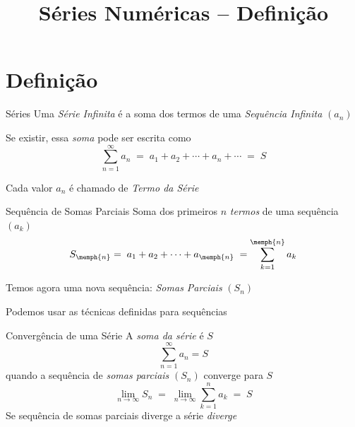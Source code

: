 \documentclass[fleqn,utf8,aspectratio=169,12pt]{beamer}
\title{Séries Numéricas -- Definição}
\begin{document}
\addtitle

\section{Definição}

\begin{frame}{Séries}
    Uma \emph{Série Infinita} é a soma dos termos de uma \emph{Sequência Infinita} $(a_n)$

    \pause
    \vspace{\baselineskip}
    Se existir, essa \emph{soma} pode ser escrita como
    \[
      \sum_{n=1}^\infty a_n
      \;=\; a_1 + a_2 + \cdots + a_n + \cdots
      \;=\; S
    \]

    \pause
    Cada valor $a_n$ é chamado de \emph{Termo da Série}

\end{frame}

\begin{frame}{Sequência de Somas Parciais}
    Soma dos primeiros $n$ \emph{termos} de uma sequência $(a_k)$
    \[
      S_{\memph{n}}
      = \; a_1 + a_2 + \cdots + a_{\memph{n}} \;
      = \sum_{k=1}^{\memph{n}} a_k
    \]

    \pause
    Temos agora uma nova sequência: \emph{Somas Parciais} $(S_n)$

    \pause
    \vspace{\baselineskip}
    Podemos usar as técnicas definidas para sequências

\end{frame}

\begin{frame}{Convergência de uma Série}
    A \emph{soma da série} é $S$
    \[
      \sum_{n=1}^\infty a_n = S
    \]
    quando a sequência de \emph{somas parciais} $(S_n)$ converge para $S$
    \pause
    \[
      \lim_{n\to\infty} S_n
      \;=\; \lim_{n\to\infty} \sum_{k=1}^n a_k
      \;=\; S
    \]
    \pause
    Se sequência de somas parciais diverge a série \emph{diverge}
\end{frame}
\end{document}
